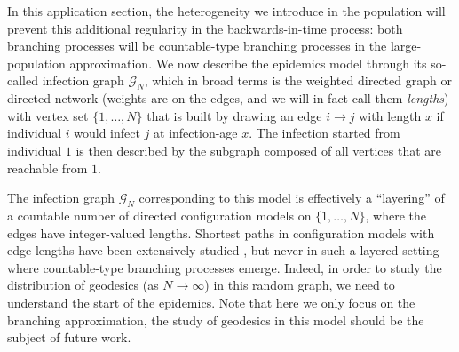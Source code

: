 In this application section, the heterogeneity we introduce in the
population will prevent this additional regularity in the
backwards-in-time process: both branching processes will be
countable-type branching processes in the large-population
approximation. We now describe the epidemics model through its
so-called infection graph $\mathcal{G}_N$, which in broad terms is the
weighted directed graph or directed network (weights are on the edges,
and we will in fact call them \emph{lengths}) with vertex set
$\{1,\dots,N\}$ that is built by drawing an edge $i\to j$ with length
$x$ if individual $i$ would infect $j$ at infection-age $x$. The
infection started from individual $1$ is then described by the
subgraph composed of all vertices that are reachable from $1$.

The infection graph $\mathcal{G}_N$ corresponding to this model is
effectively a ``layering'' of a countable number of directed
configuration models on $\{1, \dots, N\}$, where the edges have
integer-valued lengths. Shortest paths in configuration models with
edge lengths have been extensively studied \citep[see
\emph{e.g.}][]{BHH10,bhamidi_front_2014,vO18}, but never in such a
layered setting where countable-type branching processes
emerge. Indeed, in order to study the distribution of geodesics (as
$N\to\infty$) in this random graph, we need to understand the start of
the epidemics. Note that here we only focus on the branching
approximation, the study of geodesics in this model should be the
subject of future work.

